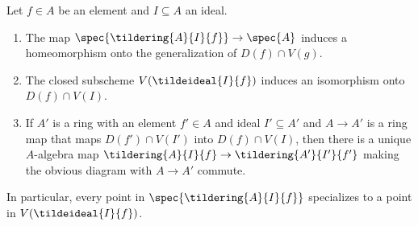 \begin{lemma}[{\stacksproject{096V}}]
    \label{lemma:locally-closed-specializations}
    Let $f \in A$ be an element and $I \subseteq A$ an ideal.
    \begin{enumerate}
        \item The map $\spec{\tildering{A}{I}{f}} \to \spec{A}$ induces
            a homeomorphism onto the generalization of $D(f) \cap V(g)$.
        \item The closed subscheme $V(\tildeideal{I}{f})$ induces an isomorphism
            onto $D(f) \cap V(I)$.
            \label{item:closed-subscheme-tilde}
        \item If $A'$ is a ring with an element $f' \in A$ and ideal $I' \subseteq A'$ and
            $A \to A'$ is a ring map that maps
            $D(f') \cap V(I')$ into $D(f) \cap V(I)$, then there is a unique $A$-algebra map
            $\tildering{A}{I}{f} \to \tildering{A'}{I'}{f'}$ making the obvious
            diagram with $A \to A'$ commute.
    \end{enumerate}
    In particular, every
    point in $\spec{\tildering{A}{I}{f}}$ specializes to a point in $V(\tildeideal{I}{f})$.
    \leanok
\end{lemma}

